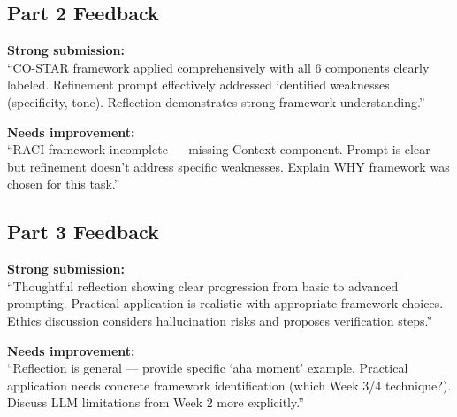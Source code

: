 \documentclass[11pt]{article}
\begin{document}
\subsection*{Part 2 Feedback}

\textbf{Strong submission:}\\
``CO-STAR framework applied comprehensively with all 6 components clearly labeled. Refinement prompt effectively addressed identified weaknesses (specificity, tone). Reflection demonstrates strong framework understanding.''

\textbf{Needs improvement:}\\
``RACI framework incomplete --- missing Context component. Prompt is clear but refinement doesn't address specific weaknesses. Explain WHY framework was chosen for this task.''

\subsection*{Part 3 Feedback}

\textbf{Strong submission:}\\
``Thoughtful reflection showing clear progression from basic to advanced prompting. Practical application is realistic with appropriate framework choices. Ethics discussion considers hallucination risks and proposes verification steps.''

\textbf{Needs improvement:}\\
``Reflection is general --- provide specific `aha moment' example. Practical application needs concrete framework identification (which Week 3/4 technique?). Discuss LLM limitations from Week 2 more explicitly.''
\end{document}
